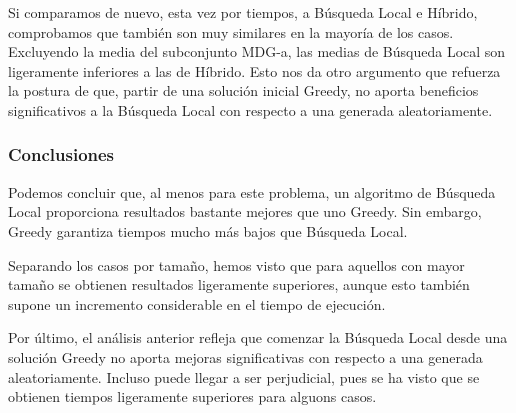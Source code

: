 \documentclass[10pt,a4paper]{article}
\begin{document}
Si comparamos de nuevo, esta vez por tiempos, a Búsqueda Local e Híbrido, comprobamos que también son muy similares en la mayoría de los casos. Excluyendo la media del subconjunto MDG-a, las medias de Búsqueda Local son ligeramente inferiores a las de Híbrido. Esto nos da otro argumento que refuerza la postura de que, partir de una solución inicial Greedy, no aporta beneficios significativos a la Búsqueda Local con respecto a una generada aleatoriamente.



\subsubsection{Conclusiones}

Podemos concluir que, al menos para este problema, un algoritmo de Búsqueda Local proporciona resultados bastante mejores que uno Greedy. Sin embargo, Greedy garantiza tiempos mucho más bajos que Búsqueda Local.

Separando los casos por tamaño, hemos visto que para aquellos con mayor tamaño se obtienen resultados ligeramente superiores, aunque esto también supone un incremento considerable en el tiempo de ejecución.

Por último, el análisis anterior refleja que comenzar la Búsqueda Local desde una solución Greedy no aporta mejoras significativas con respecto a una generada aleatoriamente. Incluso puede llegar a ser perjudicial, pues se ha visto que se obtienen tiempos ligeramente superiores para alguons casos.
\end{document}
